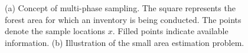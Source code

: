\begin{figure}[htb]
	\begin{subfigure}[t]{0.5\textwidth}
		\centering
		\caption{} \label{fig:concmphase_and_sae_a}
		\end{subfigure}
	\begin{subfigure}[t]{0.5\textwidth}
		\centering
		\caption{} \label{fig:concmphase_and_sae_b}
	\end{subfigure}
\caption{(a) Concept of multi-phase sampling. The square represents the forest area for which an inventory is being conducted. The points denote the sample locations $x$. Filled points indicate available information. (b) Illustration of the small area estimation problem.}
\label{fig:concmphase_and_sae}
\end{figure}

